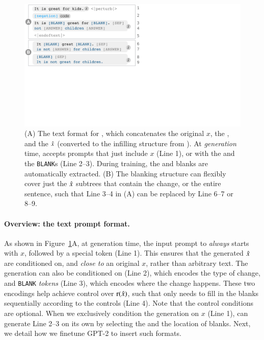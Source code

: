 \begin{figure}[t]
\centering
\includegraphics[trim={0 18.8cm 31cm 0cm}, clip, width=1\columnwidth]{figures/blank.pdf}
\vspace{-15pt}
\caption{  
(A) The text format for \sysname, which concatenates the original $x$, the \tagstr, and the $\hat{x}$ (converted to the infilling structure from ).
At \emph{generation} time, \sysname accepts prompts that just include $x$ (Line 1), or with the \tagstrshort and the \texttt{BLANK}s (Line 2--3).
During training, the \tagstrshorts and blanks are automatically extracted.
(B) The blanking structure can flexibly cover just the $\hat{x}$ subtrees that contain the change, or the entire sentence, such that Line 3--4 in (A) can be replaced by Line 6--7 or 8--9.
}
\vspace{-10pt}
\label{fig:blank}
\end{figure}



\paragraph{Overview: the text prompt format.}
As shown in Figure~\ref{fig:blank}A, at generation time, the input prompt to \sysname \emph{always} starts with $x$, followed by a special token (Line 1).
This ensures that the generated $\hat{x}$ are conditioned on, and \emph{close to} an original $x$, rather than arbitrary text.
The generation can also be conditioned on \emph{\tagstrs} (Line 2), which encodes the type of change, and \texttt{BLANK} \emph{tokens} (Line 3), which encodes where the change happens.
These two encodings help achieve control over $\operatorname*{r}(\hat{x})$, such that \sysname only needs to fill in the blanks sequentially according to the controls (Line 4).
Note that the control conditions are optional.
When we exclusively condition the generation on $x$ (Line 1), \sysname can generate Line 2--3 on its own by selecting the \tagstr and the location of blanks.
Next, we detail how we finetune GPT-2 to insert such formats.

